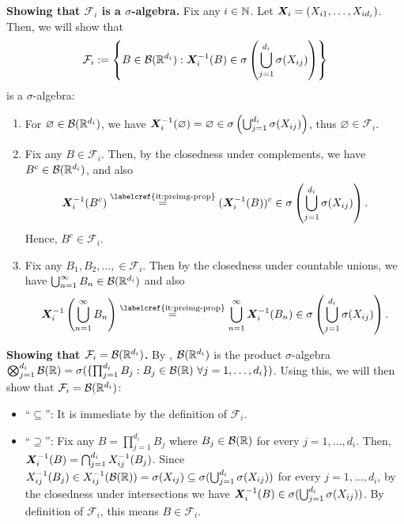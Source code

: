 \begin{enumerate}
\begin{pf}
\textbf{Showing that \(\mathcal{F}_i\) is a \(\sigma\)-algebra.} Fix any
\(i\in\mathbb{N}\). Let \(\bm{X}_i=(X_{i1},\dotsc,X_{id_i})\). Then, we will show
that \[\mathcal{F}_i:=\left\{B\in\mathcal{B}(\mathbb{R}^{d_i}):\bm{X}_i^{-1}(B)
\in\sigma\left(\bigcup_{j=1}^{d_i}\sigma(X_{ij})\right)\right\}\] is a
\(\sigma\)-algebra:
\begin{enumerate}[label={(\arabic*)}]
\item For \(\varnothing\in\mathcal{B}(\mathbb{R}^{d_i})\), we have \(\bm{X}_i^{-1}(\varnothing)=\varnothing\in
\sigma\left(\bigcup_{j=1}^{d_i}\sigma(X_{ij})\right)\), thus \(\varnothing\in\mathcal{F}_i\).
\item Fix any \(B\in\mathcal{F}_i\). Then, by the closedness under complements, we
have \(B^c\in \mathcal{B}(\mathbb{R}^{d_i})\), and also
\[
\vect{X}_i^{-1}(B^c)
\overset{\text{\labelcref{it:preimg-prop}}}{=}(\vect{X}_i^{-1}(B))^{c}
\in\sigma\left(\bigcup_{j=1}^{d_i}\sigma(X_{ij})\right).
\]
Hence, \(B^c\in\mathcal{F}_i\).
\item Fix any \(B_1,B_2,\dotsc,\in\mathcal{F}_i\). Then by the closedness under
countable unions, we have \(\bigcup_{n=1}^{\infty}B_n\in \mathcal{B}(\mathbb{R}^{d_i})\)
and also
\[
\vect{X}_i^{-1}\left(\bigcup_{n=1}^{\infty}B_n\right)
\overset{\text{\labelcref{it:preimg-prop}}}{=}\bigcup_{n=1}^{\infty}\vect{X}_i^{-1}(B_n)
\in\sigma\left(\bigcup_{j=1}^{d_i}\sigma(X_{ij})\right).
\]
\end{enumerate}
\textbf{Showing that \(\mathcal{F}_i=\mathcal{B}(\mathbb{R}^{d_i})\).}
By , \(\mathcal{B}(\mathbb{R}^{d_i})\) is the product
\(\sigma\)-algebra \(\bigotimes_{j=1}^{d_i}\mathcal{B}(\mathbb{R})=
\sigma(\{\prod_{j=1}^{d_i}B_j:B_j\in\mathcal{B}(\mathbb{R})~\forall
j=1,\dotsc,d_i\})\). Using this, we will then show that
\(\mathcal{F}_i=\mathcal{B}(\mathbb{R}^{d_i})\):
\begin{itemize}
\item ``\(\subseteq\)'': It is immediate by the definition of \(\mathcal{F}_i\).
\item ``\(\supseteq\)'': Fix any \(B=\prod_{j=1}^{d_i}B_j\) where
\(B_j\in\mathcal{B}(\mathbb{R})\) for every \(j=1,\dotsc,d_i\). Then,
\(\bm{X}_i^{-1}(B) =\bigcap_{j=1}^{d_i}X_{ij}^{-1}(B_j)\). Since
\(X_{ij}^{-1}(B_j)\in X_{ij}^{-1}(\mathcal{B}(\mathbb{R})) =\sigma(X_{ij})\subseteq
\sigma(\bigcup_{j=1}^{d_i}\sigma(X_{ij}))\) for every \(j=1,\dotsc,d_i\), by
the closedness under intersections we have \(\bm{X}_i^{-1}(B)\in
\sigma(\bigcup_{j=1}^{d_i}\sigma(X_{ij}))\). By definition of \(\mathcal{F}_i\), this means
\(B\in\mathcal{F}_i\). 


\end{itemize}
\end{pf}
\end{enumerate}
